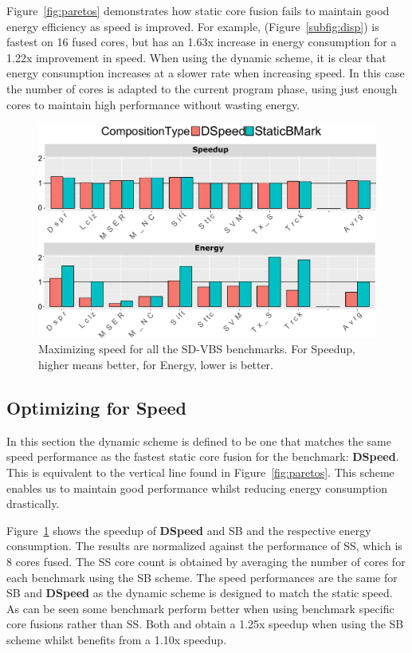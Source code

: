 Figure~\ref{fig:paretos} demonstrates how static core fusion fails to maintain good energy efficiency as speed is improved.
For example,  (Figure~\ref{subfig:disp}) is fastest on 16 fused cores, but has an 1.63x increase in energy consumption for a 1.22x improvement in speed.
When using the dynamic scheme, it is clear that energy consumption increases at a slower rate when increasing speed.
In this case the number of cores is adapted to the current program phase, using just enough cores to maintain high performance without wasting energy.


\begin{figure}
    \centering
	\includegraphics[width=1\textwidth]{cases-paper/graphics/results/speed_bars2.pdf}
    \caption{Maximizing speed for all the SD-VBS benchmarks. For Speedup, higher means better, for Energy, lower is better.}
    \label{fig:speedres}
	\vspace{1em}
\end{figure}

\subsection{Optimizing for Speed} \label{sec:dyn:speed}

In this section the dynamic scheme is defined to be one that matches the same speed performance as the fastest static core fusion for the benchmark: \textbf{DSpeed}.
This is equivalent to the vertical line found in Figure~\ref{fig:paretos}.
This scheme enables us to maintain good performance whilst reducing energy consumption drastically.

Figure~\ref{fig:speedres} shows the speedup of \textbf{DSpeed} and SB and the respective energy consumption.
The results are normalized against the performance of SS, which is 8 cores fused.
The SS core count is obtained by averaging the number of cores for each benchmark using the SB scheme. 
The speed performances are the same for SB and \textbf{DSpeed} as the dynamic scheme is designed to match the static speed.
As can be seen some benchmark perform better when using benchmark specific core fusions rather than SS.
Both  and  obtain a 1.25x speedup when using the SB scheme whilst  benefits from a 1.10x speedup.

